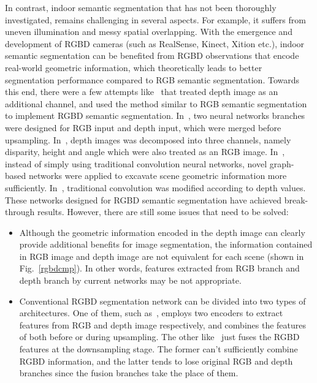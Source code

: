 \documentclass{article}
\begin{document}
In contrast, indoor semantic segmentation that has not been thoroughly investigated, remains challenging in several aspects. For example, it suffers from uneven illumination and messy spatial overlapping. With the emergence and development of RGBD cameras (such as RealSense, Kinect, Xition etc.), indoor semantic segmentation can be benefited from RGBD observations that encode real-world geometric information, which theoretically leads to better segmentation performance compared to RGB semantic segmentation. Towards this end, there were a few attempts like~\cite{gupta2014learning}\cite{he2017std2p} that treated depth image as an additional channel, and used the method similar to RGB semantic segmentation to implement RGBD semantic segmentation. In~\cite{rednet}, two neural networks branches were designed for RGB input and depth input, which were merged before upsampling. In~\cite{gupta2014learning}, depth images was decomposed into three channels, namely disparity, height and angle which were also treated as an RGB image. In~\cite{qi20173dgnn}, instead of simply using traditional convolution neural networks, novel graph-based networks were applied to excavate scene geometric information more sufficiently. In~\cite{wang2018depthaware}, traditional convolution was modified according to depth values. These networks designed for RGBD semantic segmentation have achieved break-through results. However, there are still some issues that need to be solved:










\begin{itemize}

\item Although the geometric information encoded in the depth image can clearly provide additional benefits for image segmentation, the information contained in RGB image and depth image are not equivalent for each scene (shown in Fig.~\ref{rgbdcmp}). In other words, features extracted from RGB branch and depth branch by current networks may be not appropriate.
\item Conventional RGBD segmentation network can be divided into two types of architectures. One of them, such as~\cite{miou459localitysensitive}, employs two encoders to extract features from RGB and depth image respectively, and combines the features of both before or during upsampling. The other like~\cite{rednet}\cite{chen2018progressively} just fuses the RGBD features at the downsampling stage. The former can't sufficiently combine RGBD information, and the latter tends to lose original RGB and depth branches since the fusion branches take the place of them.
\end{itemize}
\end{document}
